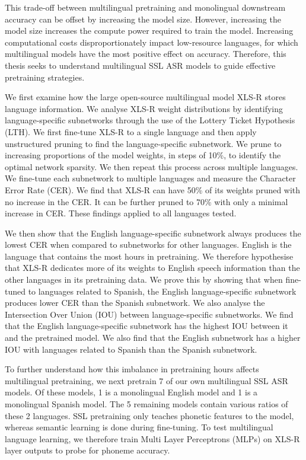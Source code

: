 \documentclass[a4paper,oneside,12pt]{book}
\numberwithin{equation}{chapter} %
\begin{document}
This trade-off between multilingual pretraining and monolingual downstream accuracy can be offset by increasing the model size. However, increasing the model size increases the compute power required to train the model. Increasing computational costs disproportionately impact low-resource languages, for which multilingual models have the most positive effect on accuracy. Therefore, this thesis seeks to understand multilingual SSL ASR models to guide effective pretraining strategies.

We first examine how the large open-source multilingual model XLS-R stores language information. We analyse XLS-R weight distributions by identifying language-specific subnetworks through the use of the Lottery Ticket Hypothesis (LTH). We first fine-tune XLS-R to a single language and then apply unstructured pruning to find the language-specific subnetwork. We prune to increasing proportions of the model weights, in steps of 10\%, to identify the optimal network sparsity. We then repeat this process across multiple languages. We fine-tune each subnetwork to multiple languages and measure the Character Error Rate (CER). We find that XLS-R can have 50\% of its weights pruned with no increase in the CER. It can be further pruned to 70\% with only a minimal increase in CER. These findings applied to all languages tested.

We then show that the English language-specific subnetwork always produces the lowest CER when compared to subnetworks for other languages. English is the language that contains the most hours in pretraining. We therefore hypothesise that XLS-R dedicates more of its weights to English speech information than the other languages in its pretraining data. We prove this by showing that when fine-tuned to languages related to Spanish, the English language-specific subnetwork produces lower CER than the Spanish subnetwork. We also analyse the Intersection Over Union (IOU) between language-specific subnetworks. We find that the English language-specific subnetwork has the highest IOU between it and the pretrained model. We also find that the English subnetwork has a higher IOU with languages related to Spanish than the Spanish subnetwork. %


To further understand how this imbalance in pretraining hours affects multilingual pretraining, we next pretrain 7 of our own multilingual SSL ASR models. Of these models, 1 is a monolingual English model and 1 is a monolingual Spanish model. The  5 remaining models contain various ratios of these 2 languages. SSL pretraining only teaches phonetic features to the model, whereas semantic learning is done during fine-tuning. To test multilingual language learning, we therefore train Multi Layer Perceptrons (MLPs) on XLS-R layer outputs to probe for phoneme accuracy. 
\end{document}
